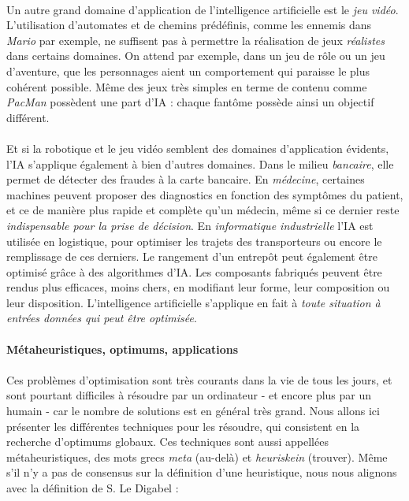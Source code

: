 \paragraph{} Un autre grand domaine d'application de l'intelligence artificielle est le \emph{jeu vidéo}. L'utilisation 
d'automates et de chemins prédéfinis, comme les ennemis dans \emph{Mario} par exemple, ne suffisent pas à permettre la réalisation
de jeux \emph{réalistes} dans certains domaines. On attend par exemple, dans un jeu de rôle ou un jeu d'aventure, que les
personnages aient un comportement qui paraisse le plus cohérent possible. Même des jeux très simples en terme de contenu
comme \emph{PacMan} possèdent une part d'IA : chaque fantôme possède ainsi un objectif différent.

\paragraph{} Et si la robotique et le jeu vidéo semblent des domaines d'application évidents, l'IA s'applique également
à bien d'autres domaines. Dans le milieu \emph{bancaire}, elle permet de détecter des fraudes à la carte bancaire. En
\emph{médecine}, certaines machines peuvent proposer des diagnostics en fonction des symptômes du patient, et ce de
manière plus rapide et complète qu'un médecin, même si ce dernier reste \emph{indispensable pour la prise de décision}.
En \emph{informatique industrielle} l'IA est utilisée en logistique, pour optimiser les trajets des transporteurs ou 
encore le remplissage de ces derniers. Le rangement d'un entrepôt peut également être optimisé grâce à des algorithmes d'IA.
Les composants fabriqués peuvent être rendus plus efficaces, moins chers, en modifiant leur forme, leur composition ou 
leur disposition. L'intelligence artificielle s'applique en fait à \emph{toute situation à entrées données qui peut
être optimisée}.

\paragraph{Métaheuristiques, optimums, applications}

\paragraph{} Ces problèmes d'optimisation sont très courants dans la vie de tous les jours, et sont pourtant
difficiles à résoudre par un ordinateur - et encore plus par un humain - car le nombre de solutions est en
général très grand. Nous allons ici présenter les différentes techniques pour les résoudre, qui consistent 
en la recherche d'optimums globaux. Ces techniques sont aussi appellées métaheuristiques, des mots grecs \emph{meta}
(au-delà) et \emph{heuriskein} (trouver). Même s'il n'y a pas de consensus sur la définition d'une heuristique, nous
nous alignons avec la définition de S. Le Digabel \cite{Metaheuristics0} :

